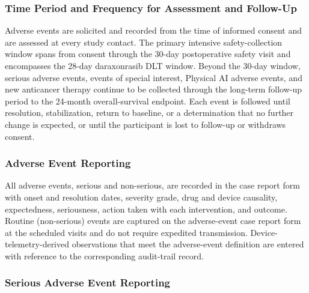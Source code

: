 \subsubsection{Time Period and Frequency for Assessment and Follow-Up}

Adverse events are solicited and recorded from the time of informed consent and are
assessed at every study contact. The primary intensive safety-collection window
spans from consent through the 30-day postoperative safety visit and encompasses the
28-day daraxonrasib DLT window. Beyond the 30-day window, serious adverse events,
events of special interest, Physical AI adverse events, and new anticancer therapy
continue to be collected through the long-term follow-up period to the 24-month
overall-survival endpoint. Each event is followed until resolution, stabilization,
return to baseline, or a determination that no further change is expected, or until
the participant is lost to follow-up or withdraws consent.

\subsubsection{Adverse Event Reporting}

All adverse events, serious and non-serious, are recorded in the case report form
with onset and resolution dates, severity grade, drug and device causality,
expectedness, seriousness, action taken with each intervention, and outcome. Routine
(non-serious) events are captured on the adverse-event case report form at the
scheduled visits and do not require expedited transmission. Device-telemetry-derived
observations that meet the adverse-event definition are entered with reference to the
corresponding audit-trail record.

\subsubsection{Serious Adverse Event Reporting}

